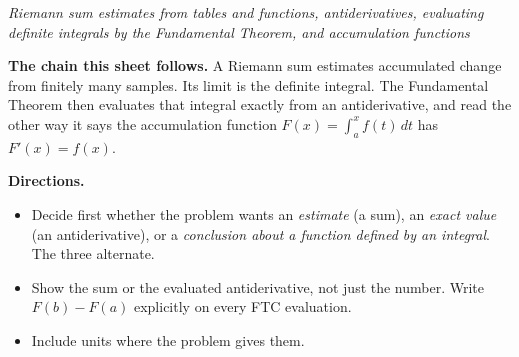 \documentclass[12pt]{article}
\begin{document}

\begin{center}
\textit{Riemann sum estimates from tables and functions, antiderivatives,
evaluating definite integrals by the Fundamental Theorem, and accumulation
functions}
\end{center}

\noindent\textbf{The chain this sheet follows.} A Riemann sum estimates
accumulated change from finitely many samples. Its limit is the definite
integral. The Fundamental Theorem then evaluates that integral exactly from an
antiderivative, and read the other way it says the accumulation function
$F(x) = \int_a^x f(t)\,dt$ has $F'(x) = f(x)$.

\noindent\textbf{Directions.}
\begin{itemize}[leftmargin=1.2cm, itemsep=2pt, topsep=2pt]
\item Decide first whether the problem wants an \emph{estimate} (a sum), an
\emph{exact value} (an antiderivative), or a \emph{conclusion about a function
defined by an integral}. The three alternate.
\item Show the sum or the evaluated antiderivative, not just the number. Write
$F(b) - F(a)$ explicitly on every FTC evaluation.
\item Include units where the problem gives them.
\end{itemize}


\end{document}
